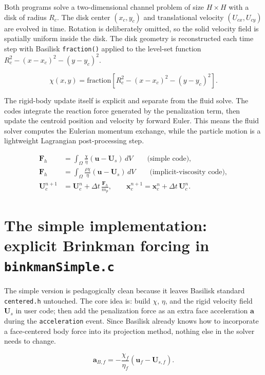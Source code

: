 \documentclass[11pt,a4paper]{article}
\begin{document}
Both programs solve a two-dimensional channel problem of size $H\times H$ with a disk of radius $R_c$. The disk center $(x_c,y_c)$ and translational velocity $(U_{cx},U_{cy})$ are evolved in time. Rotation is deliberately omitted, so the solid velocity field is spatially uniform inside the disk. The disk geometry is reconstructed each time step with Basilisk \texttt{fraction()} applied to the level-set function $R_c^2-(x-x_c)^2-(y-y_c)^2$.

\begin{equation}
\chi(x,y) = \mathrm{fraction}\!\left[R_c^2-(x-x_c)^2-(y-y_c)^2\right].
\end{equation}

The rigid-body update itself is explicit and separate from the fluid solve. The codes integrate the reaction force generated by the penalization term, then update the centroid position and velocity by forward Euler. This means the fluid solver computes the Eulerian momentum exchange, while the particle motion is a lightweight Lagrangian post-processing step.

\begin{align}
\bm{F}_h &= \int_{\Omega} \frac{\chi}{\eta}(\bm{u}-\bm{U}_s)\,dV \qquad \text{(simple code)},\\
\bm{F}_h &= \int_{\Omega} \frac{\rho\chi}{\eta}(\bm{u}-\bm{U}_s)\,dV \qquad \text{(implicit-viscosity code)},\\
\bm{U}_c^{n+1} &= \bm{U}_c^n + \Delta t\,\frac{\bm{F}_h}{m_p}, \qquad \bm{x}_c^{n+1} = \bm{x}_c^n + \Delta t\,\bm{U}_c^n.
\end{align}

\section{The simple implementation: explicit Brinkman forcing in \texttt{binkmanSimple.c}}

The simple version is pedagogically clean because it leaves Basilisk standard \texttt{centered.h} untouched. The core idea is: build $\chi$, $\eta$, and the rigid velocity field $\bm{U}_s$ in user code; then add the penalization force as an extra face acceleration $\bm{a}$ during the \texttt{acceleration} event. Since Basilisk already knows how to incorporate a face-centered body force into its projection method, nothing else in the solver needs to change.

\begin{equation}
\bm{a}_{B,f} = -\frac{\chi_f}{\eta_f}(\bm{u}_f-\bm{U}_{s,f}).
\end{equation}
\end{document}
